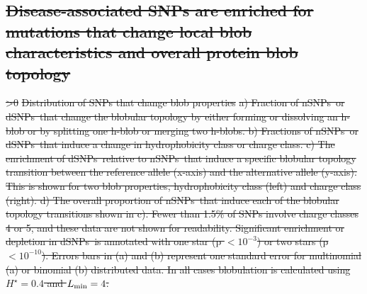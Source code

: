 \documentclass[9pt,twocolumn,twoside,lineno]{pnas-new} %
\newcommand{\dSNPs}{dSNPs~}
\newcommand{\nSNPs}{nSNPs~}
\newcommand{\hydrochar}{hydrophobicity class}
\newcommand{\chargechar}{charge class}
\newcommand{\hydrothresh}{H^{\star}}
\newcommand{\cmin}{\hydrothresh}
\newcommand{\Lmin}{L_{\rm min}}
\newcounter{includefigs}
\providecommand{\DIFdel}[1]{{\protect\color{red}\sout{#1}}}                      %
\providecommand{\DIFdelbegin}{} %
\providecommand{\DIFdelFL}[1]{\DIFdel{#1}} %
\begin{document}
\DIFdelbegin \subsection*{\DIFdel{Disease-associated SNPs are enriched for mutations that change local blob characteristics and overall protein blob topology}}
\value{\DIFdel{includefigs}}%
\DIFdel{>0 }%
{%
\DIFdelFL{Distribution of SNPs that change blob properties}%
\DIFdelFL{a) Fraction of \nSNPs or \dSNPs that change the blobular topology by either forming or dissolving an h-blob or by splitting one h-blob or merging two h-blobs. b) Fractions of \nSNPs or \dSNPs that induce a change in \hydrochar{} or \chargechar.  c) The enrichment of \dSNPs relative to \nSNPs that induce a specific blobular topology transition between the reference allele (x-axis) and the alternative allele (y-axis). This is shown for two blob properties, \hydrochar{} (left) and \chargechar{} (right). d) The overall proportion of \nSNPs that induce each of the blobular topology transitions shown in c).  Fewer than 1.5\% of SNPs involve charge classes 4 or 5, and these data are not shown for readability. Significant enrichment or depletion in \dSNPs is annotated with one star (p $< 10^{-3}$) or two stars (p $< 10^{-10}$). Errors bars in (a) and (b) represent one standard error for multinomial (a) or binomial (b) distributed data. In all cases blobulation is calculated using $\cmin=0.4$ and $\Lmin=4$.}}
\end{document}
